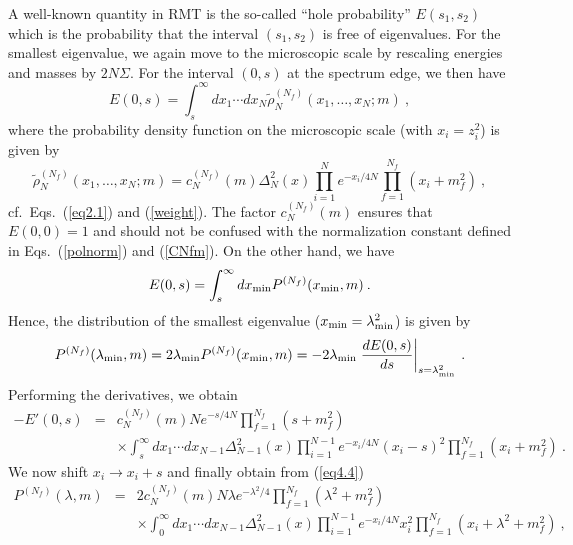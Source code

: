 A well-known quantity in RMT is the so-called ``hole probability''
$E(s_1,s_2)$ which is the probability that the interval $(s_1,s_2)$ is
free of eigenvalues.  For the smallest eigenvalue, we again move to
the microscopic scale by rescaling energies and masses by $2N\Sigma$.
For the interval $(0,s)$ at the spectrum edge, we then have
\begin{equation}
  \label{eq4.1}
  E(0,s)=\int_s^\infty dx_1\cdots dx_N \widetilde\rho_N^{(N_f)}
  (x_1,\ldots,x_N;m)\:,
\end{equation}
where the probability density function on the microscopic scale (with
$x_i=z_i^2$) is given by
\begin{equation}
  \label{eq4.2}
  \widetilde\rho_N^{(N_f)}(x_1,\ldots,x_N;m)=c_N^{(N_f)}(m)
  \Delta_N^2(x)\prod_{i=1}^Ne^{-x_i/4N} \prod_{f=1}^{N_f}(x_i+m_f^2)\:,
\end{equation}
cf.~Eqs.~(\ref{eq2.1}) and (\ref{weight}).  The factor
$c_N^{(N_f)}(m)$ ensures that $E(0,0)=1$ and should not be confused
with the normalization constant defined in Eqs.~(\ref{polnorm}) and
(\ref{CNfm}).  On the other hand, we have
\begin{equation}
  \label{eq4.3}
  E(0,s)=\int_s^\infty dx_{\rm min} P^{(N_f)}(x_{\rm min},m)\:.
\end{equation}
Hence, the distribution of the smallest eigenvalue ($x_{\rm min}
=\lambda_{\rm min}^2$) is given by
\begin{equation}
  \label{eq4.4}
  P^{(N_f)}(\lambda_{\rm min},m)=2\lambda_{\rm min}
  P^{(N_f)}(x_{\rm min},m)=
  -2\lambda_{\rm min}\left.\frac{dE(0,s)}{ds}
  \right|_{s=\lambda_{\rm min}^2} \:.
\end{equation}
Performing the derivatives, we obtain
\begin{eqnarray}
  \label{eq4.5}
  -E'(0,s)&=&c_N^{(N_f)}(m)Ne^{-s/4N}\prod_{f=1}^{N_f}(s+m_f^2)
  \nonumber\\ 
  &&\times\int_s^\infty dx_1\cdots dx_{N-1} \Delta_{N-1}^2(x)
  \prod_{i=1}^{N-1}
  e^{-x_i/4N} (x_i-s)^2 \prod_{f=1}^{N_f}(x_i+m_f^2) \:.
\end{eqnarray}
We now shift $x_i\to x_i+s$ and finally obtain from (\ref{eq4.4})
\begin{eqnarray}
  \label{eq4.7}
  P^{(N_f)}(\lambda,m)&=&2c_N^{(N_f)}(m)N\lambda e^{-\lambda^2/4}
  \prod_{f=1}^{N_f}(\lambda^2+m_f^2)\nonumber\\
  &&\times\int_0^\infty dx_1\cdots dx_{N-1} \Delta_{N-1}^2(x) 
  \prod_{i=1}^{N-1}
  e^{-x_i/4N} x_i^2 \prod_{f=1}^{N_f}(x_i+\lambda^2+m_f^2)\:,
\end{eqnarray}
